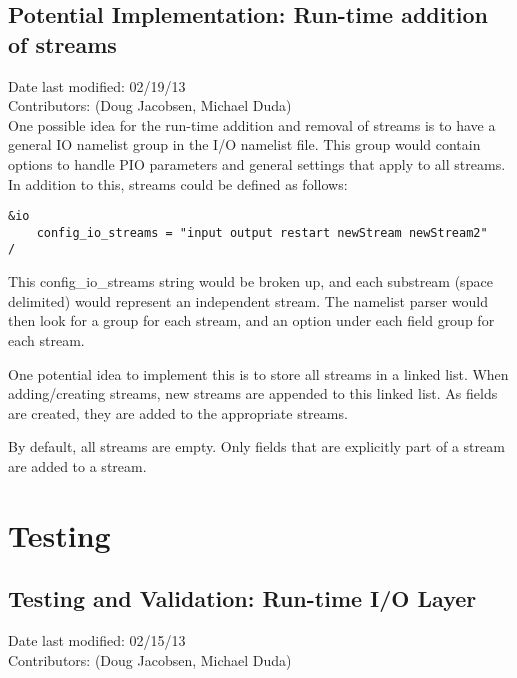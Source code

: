 \documentclass[11pt]{report}
\begin{document}
\section{Potential Implementation: Run-time addition of streams}
Date last modified: 02/19/13 \\
Contributors: (Doug Jacobsen, Michael Duda) \\

One possible idea for the run-time addition and removal of streams is to have a
general IO namelist group in the I/O namelist file. This group would contain
options to handle PIO parameters and general settings that apply to all
streams. In addition to this, streams could be defined as follows:

\begin{lstlisting}
&io
	config_io_streams = "input output restart newStream newStream2"
/
\end{lstlisting}

This config\_io\_streams string would be broken up, and each substream (space
delimited) would represent an independent stream. The namelist parser would then look
for a group for each stream, and an option under each field group for each
stream.

One potential idea to implement this is to store all streams in a linked list.
When adding/creating streams, new streams are appended to this linked list.  As
fields are created, they are added to the appropriate streams.

By default, all streams are empty. Only fields that are explicitly part of a
stream are added to a stream.


\chapter{Testing}

\section{Testing and Validation: Run-time I/O Layer}
Date last modified: 02/15/13 \\
Contributors: (Doug Jacobsen, Michael Duda) \\



\end{document}
